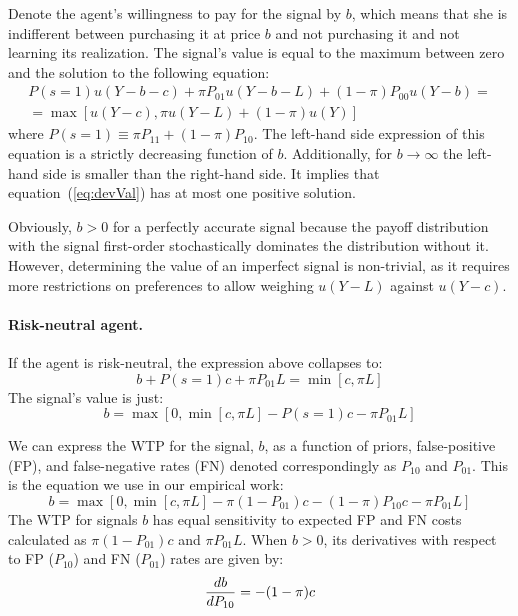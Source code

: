 \documentclass[12pt,a4paper]{article}
\begin{document}
Denote the agent's willingness to pay for the signal by $b$, which means that she is indifferent between purchasing it at price $b$ and not purchasing it and not learning its realization. The signal's value is equal to the maximum between zero and the solution to the following equation:
\begin{equation}\label{eq:devVal}
\begin{split}
P(s=1)u(Y-b-c)+\pi P_{01}u(Y-b-L)+(1-\pi)P_{00}u(Y-b)=\\=\max[u(Y-c),\pi u(Y-L)+(1-\pi) u(Y)] 
\end{split}
\end{equation}
where $P(s=1)\equiv \pi P_{11}+(1-\pi)P_{10}$. The left-hand side expression of this equation is a strictly decreasing function of $b$. Additionally, for $b\rightarrow \infty$ the left-hand side is smaller than the right-hand side. It implies that equation~(\ref{eq:devVal}) has at most one positive solution.

Obviously, $b>0$ for a perfectly accurate signal because the payoff distribution with the signal first-order stochastically dominates the distribution without it. However, determining the value of an imperfect signal is non-trivial, as it requires more restrictions on preferences to allow weighing $u(Y-L)$ against $u(Y-c)$.


\paragraph{Risk-neutral agent.} If the agent is risk-neutral, the expression above collapses to:
\[b+P(s=1)c+\pi P_{01}L=\min[c,\pi L]
\]
The signal's value is just:
\[
b=\max[0,\min[c,\pi L]-P(s=1)c-\pi P_{01}L]
\]

We can express the WTP for the signal, $b$, as a function of priors, false-positive (FP), and false-negative rates (FN) denoted correspondingly as $P_{10}$ and $P_{01}$. This is the equation we use in our empirical work:
\begin{equation}
b=\max[0,\min[c,\pi L]-\pi (1-P_{01})c-(1-\pi)P_{10}c-\pi P_{01}L]
\end{equation}\label{eq:rnWTP}
The WTP for signals $b$ has equal sensitivity to expected FP and FN costs calculated as $\pi (1-P_{01})c$ and $\pi P_{01}L$. When $b>0$, its derivatives with respect to FP ($P_{10}$) and FN ($P_{01}$) rates are given by:
\begin{equation}\label{eq:dWTP_dFP}
{db\over dP_{10}}=-(1-\pi)c
\end{equation}
\end{document}
